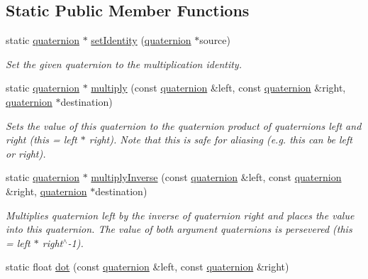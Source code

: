 \subsection*{Static Public Member Functions}
\begin{DoxyCompactItemize}
\item 
static \hyperlink{classflounder_1_1quaternion}{quaternion} $\ast$ \hyperlink{classflounder_1_1quaternion_a4f8671c6652ea6f02710dbd9b1790da8}{set\+Identity} (\hyperlink{classflounder_1_1quaternion}{quaternion} $\ast$source)
\begin{DoxyCompactList}\small\item\em Set the given quaternion to the multiplication identity. \end{DoxyCompactList}\item 
static \hyperlink{classflounder_1_1quaternion}{quaternion} $\ast$ \hyperlink{classflounder_1_1quaternion_a3ffb73ee7a773996fd78f428e6a0e151}{multiply} (const \hyperlink{classflounder_1_1quaternion}{quaternion} \&left, const \hyperlink{classflounder_1_1quaternion}{quaternion} \&right, \hyperlink{classflounder_1_1quaternion}{quaternion} $\ast$destination)
\begin{DoxyCompactList}\small\item\em Sets the value of this quaternion to the quaternion product of quaternions left and right (this = left $\ast$ right). Note that this is safe for aliasing (e.\+g. this can be left or right). \end{DoxyCompactList}\item 
static \hyperlink{classflounder_1_1quaternion}{quaternion} $\ast$ \hyperlink{classflounder_1_1quaternion_a55b90a8abb893ae6ee81f7e79b107b72}{multiply\+Inverse} (const \hyperlink{classflounder_1_1quaternion}{quaternion} \&left, const \hyperlink{classflounder_1_1quaternion}{quaternion} \&right, \hyperlink{classflounder_1_1quaternion}{quaternion} $\ast$destination)
\begin{DoxyCompactList}\small\item\em Multiplies quaternion left by the inverse of quaternion right and places the value into this quaternion. The value of both argument quaternions is persevered (this = left $\ast$ right$^\wedge$-\/1). \end{DoxyCompactList}\item 
static float \hyperlink{classflounder_1_1quaternion_ab9b9a5ba36c73f887d86c7802860cb60}{dot} (const \hyperlink{classflounder_1_1quaternion}{quaternion} \&left, const \hyperlink{classflounder_1_1quaternion}{quaternion} \&right)

\end{DoxyCompactItemize}
